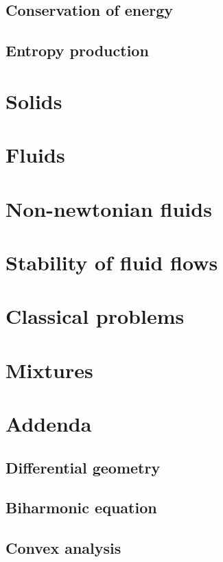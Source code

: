 \documentclass[11pt,a4paper]{book}
\begin{document}
\section{Conservation of energy}
\label{sec:1stlaw}

\section{Entropy production}
\label{sec:entropy_prod}

\chapter{Solids}
\label{chap:solids}

\chapter{Fluids}
\label{chap:fluids}

\chapter{Non-newtonian fluids}
\label{chap:non-newtonian}

\chapter{Stability of fluid flows}
\label{chap:stability}


\chapter{Classical problems}
\label{chap:classical_problems}

\chapter{Mixtures}
\label{sec:mixtures}

\chapter{Addenda}
\label{chap:addenda}

\section{Differential geometry}
\label{sec:diff_geo}


\section{Biharmonic equation}
\label{sec:biharmonic_eq}

\section{Convex analysis}
\label{sec:convex_analysis}


\newpage
\printbibliography
\end{document}
